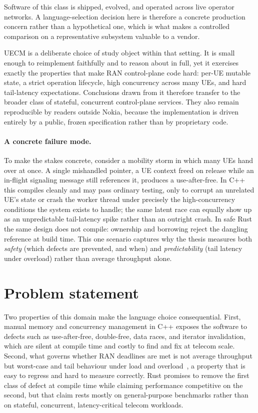 \documentclass[english,twoside,openright,a4paper,censored,csm,software-track-2020]{HYthesisML}
\begin{document}
Software of this class is shipped, evolved, and operated across live operator networks. A
language-selection decision here is therefore a concrete production concern rather than a
hypothetical one, which is what makes a controlled comparison on a representative subsystem
valuable to a vendor.

UECM is a deliberate choice of study object within that setting. It is small enough to
reimplement faithfully and to reason about in full, yet it exercises exactly the properties
that make RAN control-plane code hard: per-UE mutable state, a strict operation lifecycle,
high concurrency across many UEs, and hard tail-latency expectations. Conclusions drawn from
it therefore transfer to the broader class of stateful, concurrent control-plane services.
They also remain reproducible by readers outside Nokia, because the implementation is driven
entirely by a public, frozen specification rather than by proprietary code.

\paragraph{A concrete failure mode.}
To make the stakes concrete, consider a mobility storm in which many UEs hand over at once. A
single mishandled pointer, a UE context freed on release while an in-flight signaling message
still references it, produces a use-after-free. In C++ this compiles cleanly and may pass
ordinary testing, only to corrupt an unrelated UE's state or crash the worker thread under
precisely the high-concurrency conditions the system exists to handle; the same latent race
can equally show up as an unpredictable tail-latency spike rather than an outright crash. In
safe Rust the same design does not compile: ownership and borrowing reject the dangling
reference at build time. This one scenario captures why the thesis measures both
\emph{safety} (which defects are prevented, and when) and \emph{predictability} (tail
latency under overload) rather than average throughput alone.

\section{Problem statement}
Two properties of this domain make the language choice consequential. First, manual memory and
concurrency management in C++ exposes the software to defects such as use-after-free,
double-free, data races, and iterator invalidation, which are silent at compile time and costly
to find and fix at telecom scale. Second, what governs whether RAN deadlines are met is not
average throughput but worst-case and tail behaviour under load and
overload~\cite{dean2013tail}, a property that is easy to regress and hard to measure correctly.
Rust promises to remove the first class of defect at compile time while claiming performance
competitive on the second, but that claim rests mostly on general-purpose benchmarks rather
than on stateful, concurrent, latency-critical telecom workloads.
\end{document}
